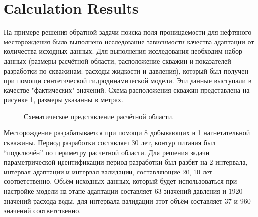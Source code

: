 \documentclass{article}
\begin{document}
\section{Сalculation Results}
На примере решения обратной задачи поиска поля проницаемости для нефтяного месторождения было выполнено исследование зависимости качества адаптации от количества исходных данных. Для выполнения исследования необходим набор данных (размеры расчётной области, расположение скважин и показателей разработки по скважинам: расходы жидкости и давления), который был получен при помощи синтетической гидродинамической модели. Эти данные выступали в качестве "фактических" значений. Схема расположения скважин представлена на рисунке \ref{fig:map}, размеры указанны в метрах. 
\begin{figure}
    \caption{Схематическое представление расчётной области.}
	\label{fig:map}
\end{figure}

Месторождение разрабатывается при помощи 8 добывающих и 1 нагнетательной скважины. Период разработки составляет 30 лет, контур питания был “подключён” по периметру расчетной области. Для решения задачи параметрической идентификации период разработки был разбит на 2 интервала, интервал адаптации и интервал валидации, составляющие 20, 10 лет соответственно. Объём исходных данных, который будет использоваться при настройке модели на этапе адаптации составляет 63 значений давления и 1920 значений расхода воды, для интервала валидации этот объём составляет 37 и 960 значений соответственно. 
\end{document}
